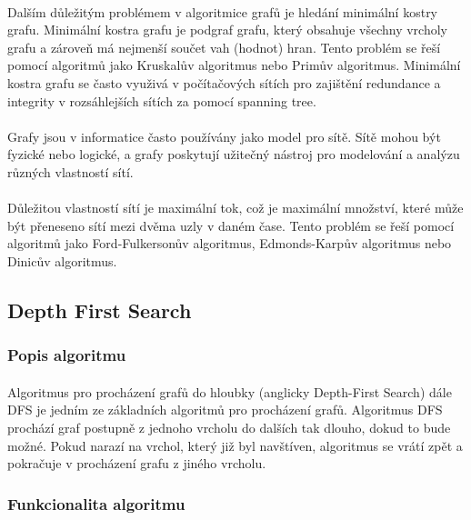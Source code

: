 \documentclass[12pt, titlepage, a4paper]{article}
\begin{document}
\paragraph{}
Dalším důležitým problémem v algoritmice grafů je hledání minimální kostry grafu. Minimální 
kostra grafu je podgraf grafu, který obsahuje všechny vrcholy grafu a zároveň má nejmenší 
součet vah (hodnot) hran. Tento problém se řeší pomocí algoritmů jako Kruskalův algoritmus nebo Primův 
algoritmus. Minimální kostra grafu se často využivá v počítačových sítích pro zajištění redundance
a integrity v rozsáhlejších sítích za pomocí spanning tree.
\paragraph{}
Grafy jsou v informatice často používány jako model pro sítě. Sítě mohou být fyzické nebo 
logické, a grafy poskytují užitečný nástroj pro modelování a analýzu různých vlastností sítí.
\paragraph{}
Důležitou vlastností sítí je maximální tok, což je maximální množství, které může být přeneseno 
sítí mezi dvěma uzly v daném čase. Tento problém se řeší pomocí algoritmů jako Ford-Fulkersonův 
algoritmus, Edmonds-Karpův algoritmus nebo Dinicův algoritmus.
\newpage

\subsection{Depth First Search}
\subsubsection{Popis algoritmu}
\paragraph{}
Algoritmus pro procházení grafů do hloubky (anglicky Depth-First Search) dále DFS
je jedním ze základních algoritmů pro procházení grafů. Algoritmus DFS prochází 
graf postupně z jednoho vrcholu do dalších tak dlouho, dokud to bude možné. 
Pokud narazí na vrchol, který již byl navštíven, algoritmus se vrátí zpět a pokračuje 
v procházení grafu z jiného vrcholu.
\cite{GeeksforGeeks: DFS,Khan Academy: DFS}

\subsubsection{Funkcionalita algoritmu}
\end{document}
